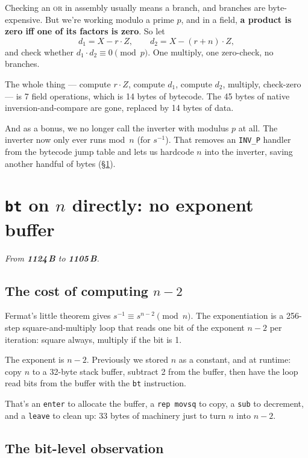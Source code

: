 \documentclass[11pt,a4paper]{article}
\newcommand{\bytes}[1]{\textcolor{blue!60!black}{\textbf{#1\,B}}}
\begin{document}
Checking an \textsc{or} in assembly usually means a branch, and
branches are byte-expensive. But we're working modulo a prime $p$,
and in a field, \textbf{a product is zero iff one of its factors is
zero}. So let
\[
  d_1 = X - r\cdot Z, \qquad d_2 = X - (r+n)\cdot Z,
\]
and check whether $d_1 \cdot d_2 \equiv 0 \pmod p$. One multiply,
one zero-check, no branches.

The whole thing --- compute $r\cdot Z$, compute $d_1$, compute $d_2$,
multiply, check-zero --- is 7 field operations, which is 14 bytes of
bytecode. The 45 bytes of native inversion-and-compare are gone,
replaced by 14 bytes of data.

And as a bonus, we no longer call the inverter with modulus $p$ at
all. The inverter now only ever runs mod~$n$ (for $s^{-1}$). That
removes an \texttt{INV\_P} handler from the bytecode jump table and
lets us hardcode $n$ into the inverter, saving another handful of
bytes (\S\ref{sec:btcn}).

\section{\texttt{bt} on $n$ directly: no exponent buffer}
\label{sec:btcn}

\noindent\emph{From \bytes{1124} to \bytes{1105}.}

\subsection{The cost of computing $n - 2$}

Fermat's little theorem gives $s^{-1} \equiv s^{n-2} \pmod n$. The
exponentiation is a 256-step square-and-multiply loop that reads one
bit of the exponent $n-2$ per iteration: square always, multiply if
the bit is 1.

The exponent is $n - 2$. Previously we stored $n$ as a constant, and
at runtime: copy $n$ to a 32-byte stack buffer, subtract 2 from the
buffer, then have the loop read bits from the buffer with the
\texttt{bt} instruction.

That's an \texttt{enter} to allocate the buffer, a \texttt{rep movsq}
to copy, a \texttt{sub} to decrement, and a \texttt{leave} to clean
up: 33 bytes of machinery just to turn $n$ into $n-2$.

\subsection{The bit-level observation}
\end{document}
